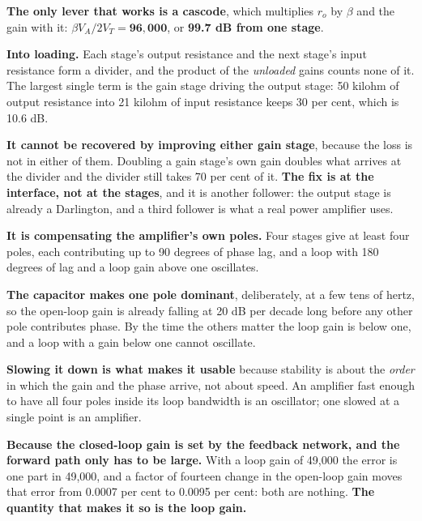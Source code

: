 \textbf{The only lever that works is a cascode}, which multiplies $r_o$ by $\beta$ and the gain with it: $\beta V_A/2V_T = \mathbf{96{,}000}$, or \textbf{99.7 dB from one stage}.


\textbf{Into loading.} Each stage's output resistance and the next stage's input resistance form a divider, and the product of the \emph{unloaded} gains counts none of it. The largest single term is the gain stage driving the output stage: 50 kilohm of output resistance into 21 kilohm of input resistance keeps 30 per cent, which is 10.6 dB.

\textbf{It cannot be recovered by improving either gain stage}, because the loss is not in either of them. Doubling a gain stage's own gain doubles what arrives at the divider and the divider still takes 70 per cent of it. \textbf{The fix is at the interface, not at the stages}, and it is another follower: the output stage is already a Darlington, and a third follower is what a real power amplifier uses.


\textbf{It is compensating the amplifier's own poles.} Four stages give at least four poles, each contributing up to 90 degrees of phase lag, and a loop with 180 degrees of lag and a loop gain above one oscillates.

\textbf{The capacitor makes one pole dominant}, deliberately, at a few tens of hertz, so the open-loop gain is already falling at 20 dB per decade long before any other pole contributes phase. By the time the others matter the loop gain is below one, and a loop with a gain below one cannot oscillate.

\textbf{Slowing it down is what makes it usable} because stability is about the \emph{order} in which the gain and the phase arrive, not about speed. An amplifier fast enough to have all four poles inside its loop bandwidth is an oscillator; one slowed at a single point is an amplifier.


\textbf{Because the closed-loop gain is set by the feedback network, and the forward path only has to be large.} With a loop gain of 49,000 the error is one part in 49,000, and a factor of fourteen change in the open-loop gain moves that error from 0.0007 per cent to 0.0095 per cent: both are nothing. \textbf{The quantity that makes it so is the loop gain.}
